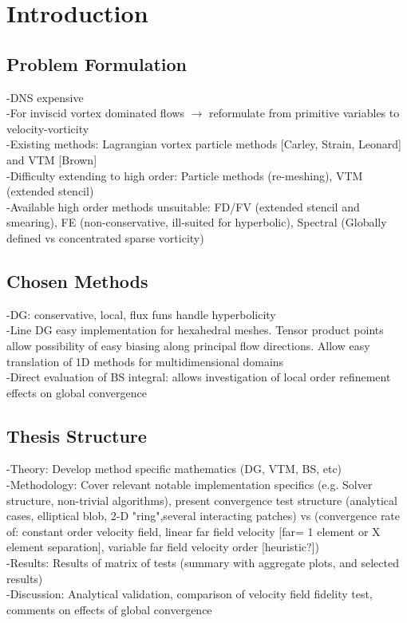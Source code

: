 \documentclass[letterpaper,12pt]{report}
\begin{document}
\chapter{Introduction}
\section{Problem Formulation}
-DNS expensive \\
-For inviscid vortex dominated flows $\rightarrow$ reformulate from primitive variables to velocity-vorticity \\
-Existing methods: Lagrangian vortex particle methods [Carley, Strain, Leonard] and VTM [Brown]\\
-Difficulty extending to high order: Particle methods (re-meshing), VTM (extended stencil)\\
-Available high order methods unsuitable: FD/FV (extended stencil and smearing), FE (non-conservative, ill-suited for hyperbolic), Spectral (Globally defined vs concentrated sparse vorticity)
\section{Chosen Methods}
-DG: conservative, local, flux funs handle hyperbolicity\\
-Line DG easy implementation for hexahedral meshes. Tensor product points allow possibility of easy biasing along principal flow directions. Allow easy translation of 1D methods for multidimensional domains\\
-Direct evaluation of BS integral: allows investigation of local order refinement effects on global convergence
\section{Thesis Structure}
-Theory: Develop method specific mathematics (DG, VTM, BS, etc)\\
-Methodology: Cover relevant notable implementation specifics (e.g. Solver structure, non-trivial algorithms), present convergence test structure (analytical cases, elliptical blob, 2-D "ring",several interacting patches) vs (convergence rate of: constant order velocity field, linear far field velocity [far= 1 element or X element separation], variable far field velocity order [heuristic?])\\
-Results: Results of matrix of tests (summary with aggregate plots, and selected results)\\
-Discussion: Analytical validation, comparison of velocity field fidelity test, comments on effects of global convergence
\end{document}
